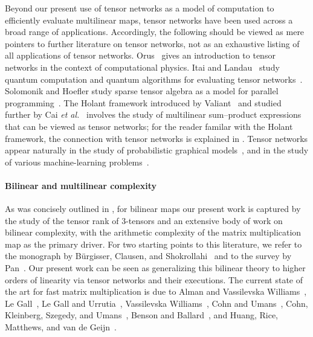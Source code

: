 Beyond our present use of tensor networks as a model of computation to efficiently evaluate multilinear maps, tensor networks 
%
have been  %
used across a broad range of applications. Accordingly, the following should be viewed as mere pointers to further literature on tensor networks, not as an exhaustive listing of all applications of tensor networks. Orus~\cite{Orus2014} gives an introduction to tensor networks in the context of computational physics. Itai and Landau~\cite{ItaiL2010} study quantum computation and quantum algorithms for evaluating tensor networks~\cite{ItaiL2010}. Solomonik and Hoefler study sparse tensor algebra as a model for parallel programming~\cite{SolomonikH2015}. The Holant framework
introduced by Valiant~\cite{Valiant2008} and studied further by
Cai \emph{et al.}~\cite{CaiLX2011,CaiGW2016a} involves the study of multilinear
sum--product expressions that can be viewed as tensor networks; for the reader familar with the Holant framework, the connection with tensor networks is explained in .
Tensor networks appear naturally in the study of probabilistic graphical
models~\cite{KollerF2009,MoitraW2018,RobevaS2017,WainwrightJ2008},
and in the study of various machine-learning
problems~\cite{CichockiLOPZM2016,CichockiPZLOSM2017}.

\paragraph*{Bilinear and multilinear complexity}

As was concisely outlined in , for bilinear maps our present work %
%
%
is captured by
%
the study of
the  %
tensor rank of 3-tensors and an extensive body of work on bilinear complexity, with the arithmetic complexity of the matrix multiplication map as the primary driver. For two starting points to this literature, we refer to the monograph by B\"urgisser, Clausen, and Shokrollahi~\cite{Buergisser1997} and to the survey by Pan~\cite{Pan2014}. Our present work can be seen as generalizing this bilinear theory to higher orders of linearity via tensor networks and their executions. The current state of the art for fast matrix multiplication is due to Alman and Vassilevska Williams~\cite{AlmanVW2021}, Le Gall~\cite{LeGall2012,LeGall2014}, Le Gall and Urrutia~\cite{LeGallU2017}, Vassilevska Williams~\cite{VassilevskaWilliams2012}, Cohn and Umans~\cite{CohnU2013}, Cohn, Kleinberg, Szegedy, and Umans~\cite{Cohn2005}, Benson and Ballard~\cite{BensonB2015}, and Huang, Rice, Matthews, and van de Geijn~\cite{HuangRMG2017}.


